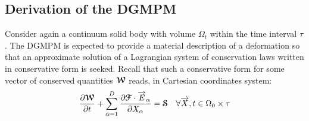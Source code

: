 

\subsection{Derivation of the DGMPM}
Consider again a continuum solid body with volume $\Omega_t$ within the time interval $\tau$. The DGMPM is expected to provide a material description of a deformation so that an approximate solution of a Lagrangian system of conservation laws written in conservative form is seeked. Recall that such a conservative form for some vector of conserved quantities ${\boldsymbol{\mathcal{W}}}$ reads, in Cartesian coordinates system:
\begin{equation}
  \label{eq:conservative_form}
  \frac{\partial {\boldsymbol{\mathcal{W}}}}{\partial t} + \sum_{\alpha=1}^D \frac{\partial {\boldsymbol{\mathcal{F}}}\cdot {\overrightarrow{E}}_\alpha}{\partial X_\alpha} = {\boldsymbol{\mathcal{S}}} \quad \forall {\overrightarrow{X}},t \in \Omega_0 \times \tau
\end{equation}

